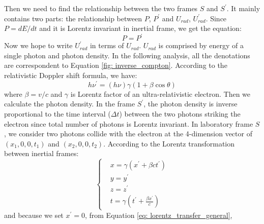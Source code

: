 \documentclass[12pt]{report}
\begin{document}
            Then we need to find the relationship between the two frames $S$ and $S^{\prime}$. 
            It mainly contains two parts: the relationship between $P$, $P^{\prime}$ and 
            $U_{rad}$, $U_{rad}^{\prime}$. Since $P = dE/dt$ and it is Lorentz invariant 
            in inertial frame, we get the equation: 
            \begin{equation}
              \label{eq: power_is_equal}
              P = P^{\prime}
            \end{equation}
            Now we hope to write $U_{rad}^{\prime}$ in terms of $U_{rad}$. $U_{rad}$ is 
            comprised by energy of a single photon and photon density. In the following
            analysis, all the denotations are correspondent to Equation \ref{fig: inverse_compton}. 
            According to the relativistic Doppler shift formula, we have: 
            \begin{equation}
              \label{eq: doppler_shift}
              h \nu^{\prime} = \left(h \nu\right) \gamma \left(1 + \beta \cos{\theta} \right)
            \end{equation}
            where $\beta = v / c$ and $\gamma$ is Lorentz factor of an ultra-relativistic 
            electron. Then we calculate the photon density. In the frame $S^{\prime}$, the 
            photon density is inverse proportional to the time interval ($\Delta t$) between 
            the two photons striking the electron since total number of photons is Lorentz 
            invariant. In laboratory frame $S$, we consider two photons collide with the 
            electron at the 4-dimension vector of 
            $\left(x_{1}, 0, 0, t_{1}\right)$ and $\left(x_{2}, 0, 0, t_{2}\right)$. 
            According to the Lorentz transformation between inertial frames: 
            \begin{equation}
              \label{eq: lorentz_transfer_general}
                \begin{cases}
                  & x = \gamma \left( x^{\prime} + \beta c t^{\prime} \right)\\
                  & y = y^{\prime} \\
                  & z = z^{\prime} \\ 
                  & t = \gamma \left(t^{\prime} + \frac{\beta x^{\prime}}{c}\right)
                \end{cases}       
            \end{equation}
            and because we set $x^{\prime} = 0$, from Equation \ref{eq: lorentz_transfer_general}, 
\end{document}
